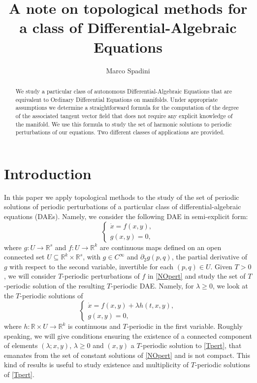 \documentclass[a4paper]{amsart}
\title[A note on topological methods for a class of DAEs]{A note on topological methods 
for a class of Differential-Algebraic Equations}
\author{Marco Spadini}
\numberwithin{equation}{section}
\newcommand{\R}{\mathbb{R}}
\begin{document}
\begin{abstract}
 We study a particular class of autonomous Differential-Algebraic Equations that are equivalent
to Ordinary Differential Equations on manifolds. Under appropriate assumptions we determine
a straightforward formula for the computation of the degree of the associated
tangent vector field that does not require any explicit knowledge of the manifold. We use 
this formula to study the set of harmonic solutions to periodic perturbations of our
equations. Two different classes of applications are provided.
\end{abstract}


\maketitle

\section{Introduction}
In this paper we  apply topological methods to the study of the set of periodic 
solutions of periodic perturbations of a particular class of differential-algebraic equations
(DAEs). Namely, we consider the following DAE in semi-explicit form:
\begin{equation}\label{NOpert}
 \left\{
\begin{array}{l}
 \dot x=f(x,y),\\
 g(x,y)=0,
\end{array}
\right.
\end{equation}
where $g:U\to\R^s$ and $f:U\to\R^k$ are continuous maps defined on an open connected set
$U\subseteq\R^k\times\R^s$, with $g\in C^\infty$ and $\partial_2g(p,q)$, the partial derivative 
of $g$ with respect to the second variable, invertible for each $(p,q)\in U$. Given $T>0$, 
we will consider $T$-periodic perturbations of $f$ in \eqref{NOpert} and study the set of 
$T$-periodic solution of the resulting $T$-periodic DAE.  Namely, for $\lambda\geq 0$,
we look at the $T$-periodic solutions of 
\begin{equation}\label{Tpert}
 \left\{
\begin{array}{l}
 \dot x=f(x,y)+\lambda h(t,x,y),\\
 g(x,y)=0,
\end{array}
\right.
\end{equation}
where $h:\R\times U\to\R^k$ is continuous and $T$-periodic in the first variable. 
Roughly speaking, we will give conditions ensuring the existence of a connected component 
of elements $(\lambda;x,y)$, $\lambda\geq 0$ and $(x,y)$ a $T$-periodic solution to 
\eqref{Tpert}, that emanates from the set of constant solutions of \eqref{NOpert} and is 
not compact. This kind of results is useful to study existence and multiplicity of 
$T$-periodic solutions of \eqref{Tpert}.
\end{document}
